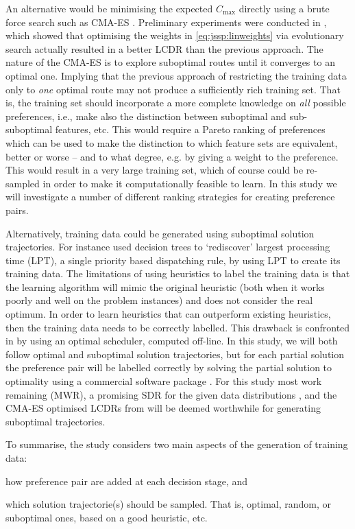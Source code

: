 \documentclass[smallextended]{llncs}
\newcommand{\shortcite}[1]{\cite{#1}}
\begin{document}
An alternative would be minimising the expected $C_{\max}$ directly using a brute force search such as CMA-ES \cite{Hansen01}. Preliminary experiments were conducted in \shortcite{InRu14a}, which showed that optimising the weights in \cref{eq:jssp:linweights} via evolutionary search actually resulted in a better LCDR than the previous approach. The nature of the CMA-ES is to explore suboptimal routes until it converges to an optimal one. Implying that the previous approach of restricting the training data only to \emph{one} optimal route may not produce a sufficiently rich training set. That is, the training set should incorporate a more complete knowledge on \emph{all} possible preferences, i.e., make also the distinction between suboptimal and sub-suboptimal features, etc.  This would require a Pareto ranking of preferences which can be used to make the distinction to which feature sets are equivalent, better or worse -- and to what degree, e.g. by giving a weight to the preference. This would result in a very large training set, which of course could be re-sampled in order to make it computationally feasible to learn. In this study we will investigate a number of different ranking strategies for creating preference pairs.

Alternatively, training data could be generated using suboptimal solution trajectories. For instance \cite{Siggi05} used decision trees to `rediscover' largest processing time (LPT),  a single priority based dispatching rule, by 
using LPT to create its training data. The limitations of using heuristics to label the training data is that the learning algorithm will mimic the original heuristic (both when it works poorly and well on the problem instances) and does not consider the real optimum. In order to learn heuristics that can outperform existing heuristics, then the training data needs to be correctly labelled. This drawback is confronted in \cite{Malik08,Russell09,Siggi10} by using an optimal scheduler, computed off-line. In this study, we will both follow optimal and suboptimal solution trajectories, but for each partial solution the preference pair will be labelled correctly by solving the partial solution to optimality using a commercial software package \cite{gurobi}. 
For this study most work remaining (MWR), a promising SDR for the given data distributions \cite{InRu12}, and the CMA-ES optimised LCDRs from \cite{InRu14a} will be deemed worthwhile for generating suboptimal trajectories.

To summarise, the study considers two main aspects of the generation of training data: 
\begin{inparaenum} 
\item how preference pair are added at each decision stage, and
\item which solution trajectorie(s) should be sampled. That is, optimal, random, or suboptimal ones, based on a good 
heuristic, etc.
\end{inparaenum}
\end{document}
